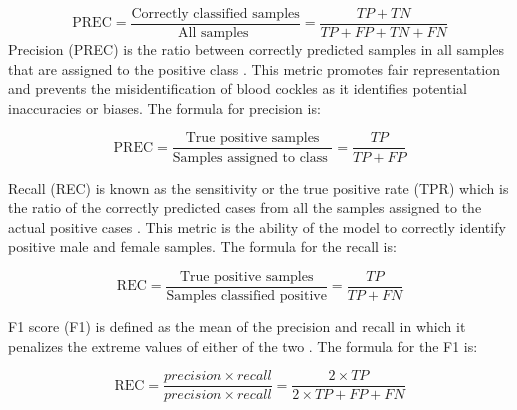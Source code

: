\begin{equation}
	\text{PREC} = \frac{\text{Correctly classified samples}} {\text{All samples }} = \frac{TP+ TN}{TP + FP + TN + FN}
	\label{eq:acc}
\end{equation}
Precision (PREC) is the ratio between correctly predicted samples in all samples that are assigned to the positive class \cite{cui2020}. This metric promotes fair representation and prevents the misidentification of blood cockles as it identifies potential inaccuracies or biases. The formula for precision is:


\begin{equation}
	\text{PREC} = \frac{\text{True positive samples}} {\text{Samples assigned to class }} = \frac{TP}{TP + FP}
	\label{eq:prec}
\end{equation}

Recall (REC) is known as the sensitivity or the true positive rate (TPR) which is the ratio of the correctly predicted cases from all the samples assigned to the actual positive cases \cite{cui2020}. This metric is the ability of the model to correctly identify positive male and female samples. The formula for the recall is:

\begin{equation}
	\text{REC} = \frac{\text{True positive samples}} {\text{Samples classified positive}} = \frac{TP}{TP + FN}
	\label{eq:rec}
\end{equation}

F1 score (F1) is defined as the mean of the precision and recall in which it penalizes the extreme values of either of the two \cite{cui2020}. The formula for the F1 is: 

\begin{equation}
	\text{REC} = \frac{ precision \times recall }{precision \times recall }= \frac{2 \times TP}{2 \times TP + FP + FN}
	\label{eq:f1}
\end{equation}
